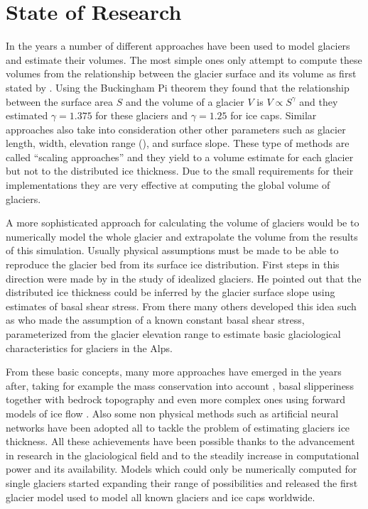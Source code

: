 \section{State of Research}\label{research}
In the years a number of different approaches have been used to model glaciers and estimate their volumes.
The most simple ones only attempt to compute these volumes from the relationship between the glacier surface and its volume as first stated by \citet{bahr1997}. Using the Buckingham Pi
theorem they found that the relationship between the surface area $S$ and the volume of a glacier $V$ is $V \propto S^{\gamma}$ and they estimated $\gamma=1.375$ for these glaciers and $\gamma=1.25$ for ice caps. Similar approaches also take into consideration other other parameters such as glacier length, width, elevation range (\citet{Grinsted2013}), and surface slope. These type of methods are called ``scaling approaches'' and they yield to a volume estimate for each glacier but not to the distributed ice thickness. Due to the small requirements for their implementations they are very effective at computing the global volume of glaciers.

A more sophisticated approach for calculating the volume of glaciers would be to numerically model the whole glacier and extrapolate the volume from the results of this simulation. Usually physical assumptions must be made to be able to reproduce the glacier bed from its surface ice distribution.
First steps in this direction were made by \citet{Nye1965} in the study of  idealized glaciers. He pointed out that the distributed ice thickness could be inferred by the glacier surface slope using estimates of basal shear stress. From there many others developed this idea such as \citet{haeberli1995} who made the assumption of a known constant basal shear stress, parameterized from the glacier elevation range to estimate basic glaciological characteristics for glaciers in the Alps. 

From these basic concepts, many more approaches have emerged in the years after, taking for example the mass conservation into account \citet{rasmussen_1988}, basal slipperiness together with bedrock topography \citet{Gudmundsson2001} and even more complex ones using forward models of ice flow \citet{vanPelt2013}. Also some non physical methods such as artificial neural networks \citet{Clarke2009} have been adopted all to tackle the problem of estimating glaciers ice thickness. All these achievements have been possible thanks to the advancement in research in the glaciological field and to the steadily increase in computational power and its availability. Models which could only be numerically computed for single glaciers started expanding their range of possibilities and \citet{Huss2012} released the first glacier model used to model all known glaciers and ice caps worldwide.

